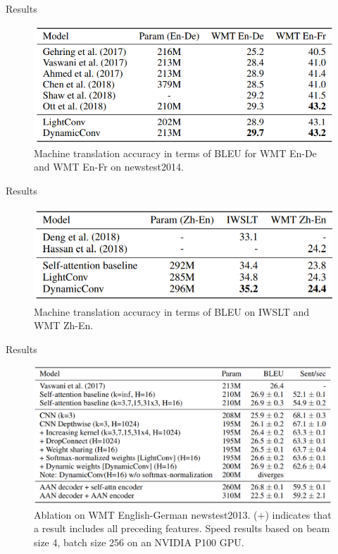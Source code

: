 \documentclass{beamer}
\begin{document}
\begin{frame}{Results}

\begin{figure}[h]
\includegraphics[width=1.0\textwidth]{img/results1}
\caption{ Machine translation accuracy in terms of BLEU for WMT En-De and WMT En-Fr on
newstest2014.}
\end{figure}
\end{frame}
\begin{frame}{Results}

\begin{figure}[h]
\includegraphics[width=1.0\textwidth]{img/results2}
\caption{ Machine translation accuracy in terms of BLEU on IWSLT and WMT Zh-En.}
\end{figure}
\end{frame}
\begin{frame}{Results}

\begin{figure}[h]
\includegraphics[width=1.0\textwidth]{img/results3}
\caption{Ablation on WMT English-German newstest2013. (+) indicates that a result includes all
preceding features. Speed results based on beam size 4, batch size 256 on an NVIDIA P100 GPU.}
\end{figure}
\end{frame}
\end{document}
